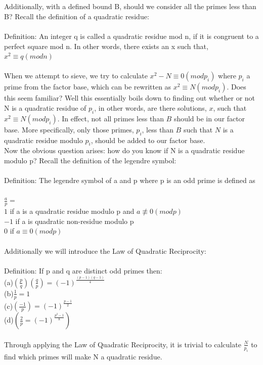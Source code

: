 \documentclass[12pt]{article} %
\begin{document}
\\\\
Additionally, with a defined bound B, should we consider all the primes less than B? Recall the definition of a quadratic residue:
\\\\
Definition: An integer q is called a quadratic residue mod n, if it is congruent to a perfect square mod n. In other words, there exists an x such that, $x^{2} \equiv q(mod n)$ 
\\\\
When we attempt to sieve, we try to calculate $x^{2}-N\equiv 0(mod p_i)$ where $p_i$ a prime from the factor base, which can be rewritten as $x^{2} \equiv N(mod p_i)$. Does this seem familiar? Well this essentially boils down to finding out whether or not N is a quadratic residue of $p_i$, in other words, are there solutions, $x$, such that $x^{2}\equiv N(mod p_i)$. In effect, not all primes less than $B$ should be in our factor base. More specifically, only those primes, $p_i$, less than $B$ such that $N$ is a quadratic residue modulo $p_i$, should be added to our factor base. 
\\Now the obvious question arises: how do you know if N is a quadratic residue modulo p? Recall the definition of the legendre symbol:
\\\\
Definition: The legendre symbol of a and p where p is an odd prime is defined as 
\\\\
$\frac{a}{p} = $
\\$1$ if a is a quadratic residue modulo p and $a\not\equiv 0(mod p)$
\\$-1$ if a is quadratic non-residue modulo p
\\$0$ if $a\equiv 0(mod p)$
\\\\Additionally we will introduce the Law of Quadratic Reciprocity:
\\\\
Definition: If p and q are distinct odd primes then:
\\(a)$(\frac{p}{q})(\frac{q}{p}) = (-1)^{\frac{(p-1)(q-1)}{4}}$
\\(b)$\frac{1}{p} = 1$
\\(c)$(\frac{-1}{p}) = (-1)^{\frac{p-1}{2}}$
\\(d)$(\frac{2}{p} = (-1)^{\frac{p^{2}-1}{8}})$
\\\\
Through applying the Law of Quadratic Reciprocity, it is trivial to calculate $\frac{N}{p_i}$ to find which primes will make N a quadratic residue.
\end{document}
